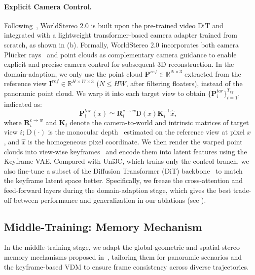 \documentclass{article} %
\begin{document}
\paragraph{Explicit Camera Control.}
Following~\cite{cao2025uni3c,worldstereo2026}, WorldStereo 2.0 is built upon the pre-trained video DiT and integrated with a lightweight transformer-based camera adapter trained from scratch, as shown in (b).
Formally, WorldStereo 2.0 incorporates both camera Plücker rays~\cite{sitzmann2021light} and point clouds as complementary camera guidance to enable explicit and precise camera control for subsequent 3D reconstruction.
In the domain-adaption, we only use the point cloud $\mathbf{P}^{ref}\in\mathbb{R}^{N\times 3}$ extracted from the reference view $\mathbf{I}^{ref}\in\mathbb{R}^{H\times W\times 3}$ ($N\leq HW$, after filtering floaters), instead of the panoramic point cloud.
We warp it into each target view to obtain $\{\mathbf{P}^{tar}_{i}\}_{i=1}^{T_{kf}}$, indicated as:
\begin{equation}
\mathbf{P}^{tar}_i(x) \simeq \mathbf{R}^{c \rightarrow w}_i \mathrm{D}(x) \mathbf{K}^{-1}_i \hat{x},
\label{eq_pcd}
\end{equation}
where $\mathbf{R}^{c \rightarrow w}_i$ and $\mathbf{K}_i$ denote the camera-to-world and intrinsic matrices of target view $i$; $\mathrm{D}(\cdot)$ is the monocular depth~\cite{wang2025moge} estimated on the reference view at pixel $x$, and $\hat{x}$ is the homogeneous pixel coordinate.
We then render the warped point clouds into view-wise keyframes~\cite{ravi2020pytorch3d} and encode them into latent features using the Keyframe-VAE.
Compared with Uni3C, which trains only the control branch, we also fine-tune a subset of the Diffusion Transformer (DiT) backbone~\cite{peebles2023scalable} to match the keyframe latent space better. 
Specifically, we freeze the cross-attention and feed-forward layers during the domain-adaption stage, which gives the best trade-off between performance and generalization in our ablations (see ).
 


\subsection{Middle-Training: Memory Mechanism}
\label{sec:world_expand_memory}

In the middle-training stage, we adapt the global-geometric and spatial-stereo memory mechanisms proposed in~\cite{worldstereo2026}, tailoring them for panoramic scenarios and the keyframe-based VDM to ensure frame consistency across diverse trajectories.
\end{document}
